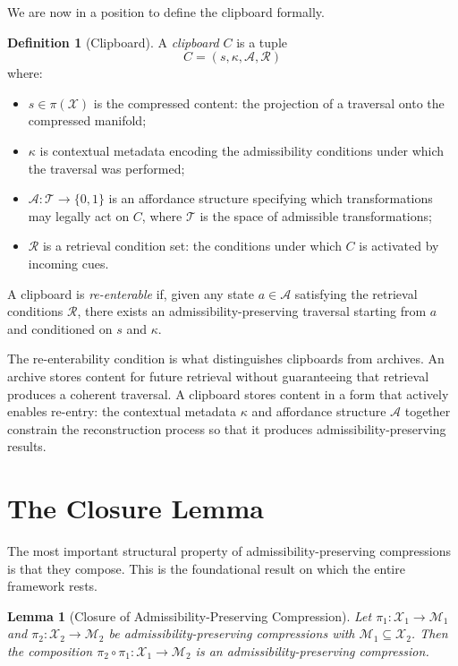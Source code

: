 \documentclass[12pt,oneside]{book}
\theoremstyle{plain}
\newtheorem{lemma}[theorem]{Lemma}
\theoremstyle{definition}
\newtheorem{definition}[theorem]{Definition}
\theoremstyle{plain}
\newcommand{\cA}{\mathcal{A}}
\newcommand{\cM}{\mathcal{M}}
\newcommand{\cR}{\mathcal{R}}
\newcommand{\cT}{\mathcal{T}}
\newcommand{\cX}{\mathcal{X}}
\begin{document}
We are now in a position to define the clipboard formally.

\begin{definition}[Clipboard]
A \emph{clipboard} $C$ is a tuple
\[
C = (s, \kappa, \cA, \cR)
\]
where:
\begin{itemize}[noitemsep]
\item[(i)] $s \in \pi(\cX)$ is the compressed content: the projection of a traversal onto the compressed manifold;
\item[(ii)] $\kappa$ is contextual metadata encoding the admissibility conditions under which the traversal was performed;
\item[(iii)] $\cA : \cT \to \{0,1\}$ is an affordance structure specifying which transformations may legally act on $C$, where $\cT$ is the space of admissible transformations;
\item[(iv)] $\cR$ is a retrieval condition set: the conditions under which $C$ is activated by incoming cues.
\end{itemize}
A clipboard is \emph{re-enterable} if, given any state $a \in \cA$ satisfying the retrieval conditions $\cR$, there exists an admissibility-preserving traversal starting from $a$ and conditioned on $s$ and $\kappa$.
\end{definition}

The re-enterability condition is what distinguishes clipboards from archives. An archive stores content for future retrieval without guaranteeing that retrieval produces a coherent traversal. A clipboard stores content in a form that actively enables re-entry: the contextual metadata $\kappa$ and affordance structure $\cA$ together constrain the reconstruction process so that it produces admissibility-preserving results.

\section{The Closure Lemma}

The most important structural property of admissibility-preserving compressions is that they compose. This is the foundational result on which the entire framework rests.

\begin{lemma}[Closure of Admissibility-Preserving Compression]
\label{lem:closure}
Let $\pi_1 : \cX_1 \to \cM_1$ and $\pi_2 : \cX_2 \to \cM_2$ be admissibility-preserving compressions with $\cM_1 \subseteq \cX_2$. Then the composition $\pi_2 \circ \pi_1 : \cX_1 \to \cM_2$ is an admissibility-preserving compression.
\end{lemma}
\end{document}

